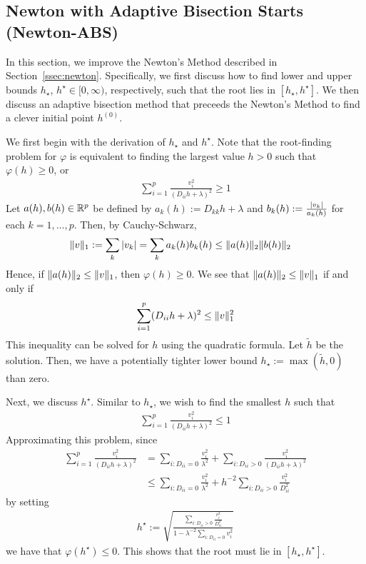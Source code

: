 \subsection{Newton with Adaptive Bisection Starts (Newton-ABS)}\label{ssec:newton-abs}

In this section, we improve the Newton's Method described in Section~\ref{ssec:newton}.
Specifically, we first discuss how to find lower and upper bounds $h_\star$, $h^\star \in [0,\infty)$,
respectively, such that the root lies in $[h_\star, h^\star]$.
We then discuss an adaptive bisection method that preceeds the Newton's Method
to find a clever initial point $h^{(0)}$.

We first begin with the derivation of $h_\star$ and $h^\star$.
Note that the root-finding problem for $\varphi$
is equivalent to finding the largest value $h > 0$ such that $\varphi(h) \geq 0$, or
\begin{align*}
    \sum\limits_{i=1}^p
    \frac{v_i^2}{(D_{ii} h + \lambda)^2}
    \geq
    1
\end{align*}
Let $a(h), b(h) \in \mathbb{R}^p$ be defined by $a_k(h) := D_{kk} h + \lambda$
and $b_k(h) := \frac{\left|v_k\right|}{a_k(h)}$ for each $k=1,\ldots, p$.
Then, by Cauchy-Schwarz,
\begin{align*}
    \|v\|_1
    &:=
    \sum\limits_{k} \left|v_k\right|
    =
    \sum\limits_{k} a_k(h) b_k(h)
    \leq
    \|a(h)\|_{2} \|b(h)\|_2
\end{align*}
Hence, if $\|a(h)\|_2 \leq \|v\|_1$,
then $\varphi(h) \geq 0$.
We see that $\|a(h)\|_2 \leq \|v\|_1$ if and only if
\begin{align*}
    \sum\limits_{i=1}^p
    (D_{ii} h + \lambda)^2
    \leq
    \|v\|_1^2
\end{align*}
This inequality can be solved for $h$ using the quadratic formula.
Let $\tilde{h}$ be the solution.
Then, we have a potentially tighter lower bound $h_\star := \max(\tilde{h}, 0)$ than zero.

Next, we discuss $h^\star$.
Similar to $h_\star$, we wish to find the smallest $h$ such that
\begin{align*}
    \sum\limits_{i=1}^p
    \frac{v_i^2}{(D_{ii} h + \lambda)^2}
    \leq
    1
\end{align*}
Approximating this problem, since
\begin{align}
    \sum\limits_{i=1}^p
    \frac{v_i^2}{(D_{ii} h + \lambda)^2}
    &=
    \sum\limits_{i: D_{ii} = 0}
    \frac{v_i^2}{\lambda^2}
    +
    \sum\limits_{i: D_{ii} > 0}
    \frac{v_i^2}{(D_{ii} h + \lambda)^2}
    \nonumber\\&\leq 
    \sum\limits_{i: D_{ii} = 0}
    \frac{v_i^2}{\lambda^2}
    +
    h^{-2}
    \sum\limits_{i: D_{ii} > 0}
    \frac{v_i^2}{D_{ii}^2 }
    \label{eq:nmab:upper-approx}
\end{align}
by setting 
\begin{align*}
    h^\star
    := 
    \sqrt{
        \frac{
            \sum\limits_{i: D_{ii} > 0} \frac{v_i^2}{D_{ii}^2}
        }{
            1 - \lambda^{-2} \sum\limits_{i : D_{ii} = 0} v_i^2
        }
    }
\end{align*}
we have that $\varphi(h^\star) \leq 0$.
This shows that the root must lie in $[h_\star, h^\star]$.

